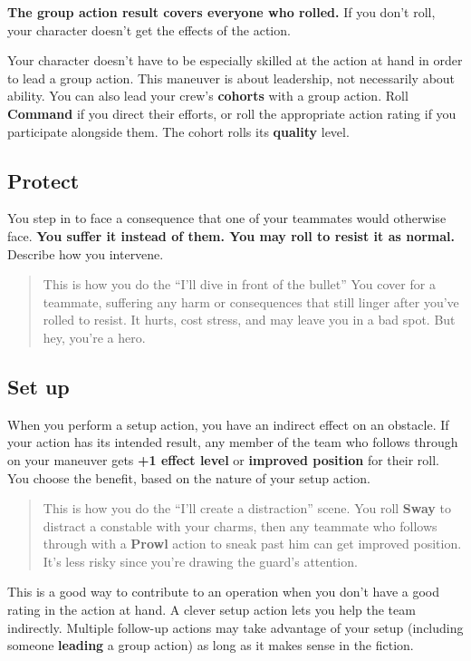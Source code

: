 \documentclass[11pt,fleqn,a5paper]{book}
\newcommand{\gameterm}[1]{\textbf{#1}}
\begin{document}
\textbf{The group action result covers everyone who rolled.} If you don’t roll, your character doesn’t get the effects of the action.

Your character doesn’t have to be especially skilled at the action at hand in order to lead a group action. This maneuver is about leadership, not necessarily about ability. You can also lead your crew’s \textbf{cohorts} with a group action. Roll \gameterm{Command}  if you direct their efforts, or roll the appropriate action rating if you participate alongside them. The cohort rolls its \textbf{quality} level.

\subsection{Protect}

You step in to face a consequence that one of your teammates would otherwise face. \textbf{You suffer it instead of them. You may roll to resist it as normal.} Describe how you intervene.

\begin{quote}
	This is how you do the “I’ll dive in front of the bullet” You cover for a teammate, suffering any harm or consequences that still linger after you’ve rolled to resist. It hurts, cost stress, and may leave you in a bad spot. But hey, you’re a hero.
\end{quote} 

\subsection{Set up}

When you perform a setup action, you have an indirect effect on an obstacle. If your action has its intended result, any member of the team who follows through on your maneuver gets \textbf{+1 effect level} or \textbf{improved position} for their roll. You choose the benefit, based on the nature of your setup action.

\begin{quote}
	This is how you do the “I’ll create a distraction” scene. You roll \gameterm{Sway}  to distract a constable with your charms, then any teammate who follows through with a \gameterm{Prowl}  action to sneak past him can get improved position. It’s less risky since you’re drawing the guard’s attention.
\end{quote} 

This is a good way to contribute to an operation when you don’t have a good rating in the action at hand. A clever setup action lets you help the team indirectly. Multiple follow-up actions may take advantage of your setup (including someone \textbf{leading} a group action) as long as it makes sense in the fiction.
\end{document}
